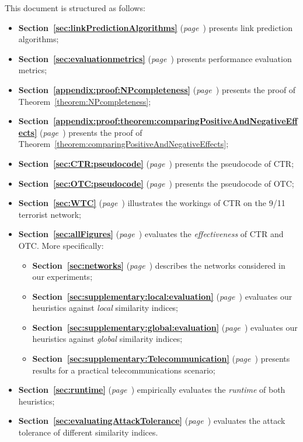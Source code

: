 \documentclass[twocolumn]{article}
\begin{document}
This document is structured as follows:
\smallskip\smallskip
\begin{itemize}\itemsep0.5em
\item \textbf{Section~\ref{sec:linkPredictionAlgorithms}} (\emph{page~\pageref{sec:linkPredictionAlgorithms}}) presents link prediction algorithms;
%
\item \textbf{Section~\ref{sec:evaluationmetrics}} (\emph{page~\pageref{sec:evaluationmetrics}}) presents performance evaluation metrics; 
%
\item \textbf{Section~\ref{appendix:proof:NPcompleteness}} (\emph{page~\pageref{appendix:proof:NPcompleteness}}) presents the proof of Theorem~\ref{theorem:NPcompleteness};
%
\item \textbf{Section~\ref{appendix:proof:theorem:comparingPositiveAndNegativeEffects}} (\emph{page~\pageref{appendix:proof:theorem:comparingPositiveAndNegativeEffects}}) presents the proof of Theorem~\ref{theorem:comparingPositiveAndNegativeEffects};
%
\item \textbf{Section~\ref{sec:CTR:pseudocode}} (\emph{page~\pageref{sec:CTR:pseudocode}}) presents the pseudocode of CTR;
%
\item \textbf{Section~\ref{sec:OTC:pseudocode}} (\emph{page~\pageref{sec:OTC:pseudocode}}) presents the pseudocode of OTC;
%
\item \textbf{Section~\ref{sec:WTC}} (\emph{page~\pageref{sec:WTC}}) illustrates the workings of CTR on the 9/11 terrorist network;
%
\item \textbf{Section~\ref{sec:allFigures}} (\emph{page~\pageref{sec:allFigures}}) evaluates the \textit{effectiveness} of CTR and OTC. More specifically:
%
\begin{itemize}
\item \textbf{Section~\ref{sec:networks}} (\emph{page~\pageref{sec:networks}}) describes the networks considered in our experiments;
%
\item \textbf{Section~\ref{sec:supplementary:local:evaluation}} (\emph{page~\pageref{sec:supplementary:local:evaluation}}) evaluates our heuristics against \emph{local} similarity indices;
%
\item \textbf{Section~\ref{sec:supplementary:global:evaluation}} (\emph{page~\pageref{sec:supplementary:global:evaluation}}) evaluates our heuristics against \emph{global} similarity indices;
%
\item \textbf{Section~\ref{sec:supplementary:Telecommunication}} (\emph{page~\pageref{sec:supplementary:Telecommunication}}) presents results for a practical telecommunications scenario;
%
\end{itemize}
%
\item \textbf{Section~\ref{sec:runtime}} (\emph{page~\pageref{sec:runtime}}) empirically evaluates the \textit{runtime} of both heuristics;
%
\item \textbf{Section~\ref{sec:evaluatingAttackTolerance}} (\emph{page~\pageref{sec:evaluatingAttackTolerance}}) evaluates the attack tolerance of different similarity indices.
\end{itemize}
\end{document}
